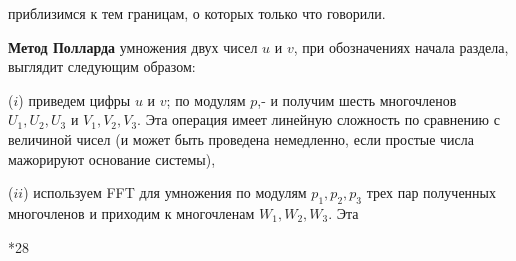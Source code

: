 приблизимся к тем границам, о которых только что говорили. \par
   \textbf{Метод Полларда} умножения двух чисел $u$ и $v$, при обозначениях
начала раздела, выглядит следующим образом: \par
($i$) приведем цифры $u$ и $v$; по модулям $p$,- и получим шесть 
многочленов $U_{1}, U_{2}, U_{3}$ и $V_{1},V_{2}, V_{3}$. Эта операция имеет линейную сложность по сравнению с величиной чисел (и может быть проведена немедленно, если простые числа мажорируют основание системы),\par
($ii$) используем FFT для умножения по модулям $p_{1}, p_{2}, p_{3}$ трех пар\linebreak
полученных многочленов и приходим к многочленам $W_{1}, W_{2}, W_{3}$. Эта \linebreak
\begin{flushleft}
\scriptsize
*28
\end{flushleft}

\pagebreak
\newpage


